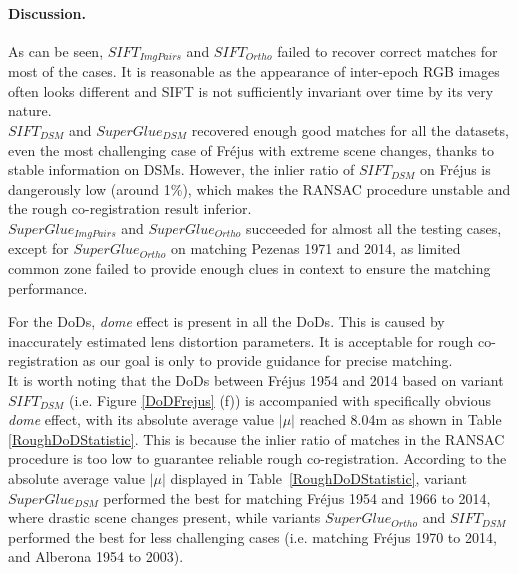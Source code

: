 \paragraph{Discussion.} 
\label{para:Discussion}
As can be seen, $SIFT_{ImgPairs}$ and $SIFT_{Ortho}$ failed to recover correct matches for most of the cases. It is reasonable as the appearance of inter-epoch RGB images often looks different and SIFT is not sufficiently invariant over time by its very nature. \\
$SIFT_{DSM}$ and $SuperGlue_{DSM}$ recovered enough good matches for all the datasets, even the most challenging case of Fr{\'e}jus with extreme scene changes, thanks to stable information on DSMs. However, the inlier ratio of $SIFT_{DSM}$ on Fr{\'e}jus is dangerously low (around 1\%), which makes the RANSAC procedure unstable and the rough co-registration result inferior. \\
$SuperGlue_{ImgPairs}$ and $SuperGlue_{Ortho}$ succeeded for almost all the testing cases, except for $SuperGlue_{Ortho}$ on matching Pezenas 1971 and 2014, as limited common zone failed to provide enough clues in context to ensure the matching performance.\\
\par
For the \ac{DoD}s, \textit{dome} effect is present in all the \ac{DoD}s. %
This is caused by inaccurately estimated lens distortion parameters.
It is acceptable for rough co-registration as our goal is only to provide guidance for precise matching. \\
It is worth noting that the \ac{DoD}s between Fr{\'e}jus 1954 and 2014 based on variant $SIFT_{DSM}$ (i.e. Figure \ref{DoDFrejus} (f)) is accompanied with specifically obvious \textit{dome} effect, with its absolute average value $|\mu|$ reached 8.04m as shown in Table \ref{RoughDoDStatistic}. This is because the inlier ratio of matches in the RANSAC procedure is too low to guarantee reliable rough co-registration. According to the absolute average value $|\mu|$ displayed in Table~\ref{RoughDoDStatistic}, variant $SuperGlue_{DSM}$ performed the best for matching Fr{\'e}jus 1954 and 1966 to 2014, where drastic scene changes present, while variants $SuperGlue_{Ortho}$ and $SIFT_{DSM}$ performed the best for less challenging cases (i.e. matching Fr{\'e}jus 1970 to 2014, and Alberona 1954 to 2003). %


